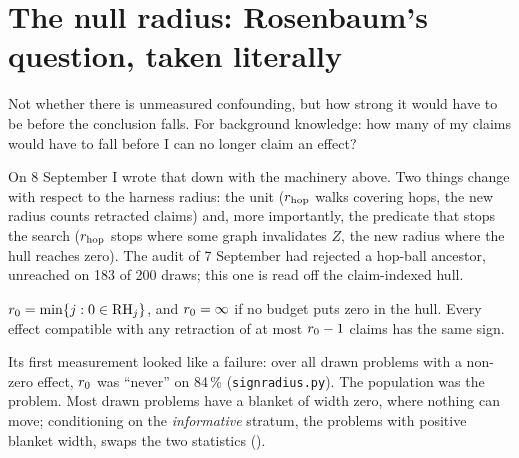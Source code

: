 
\begin{antes}
\end{antes}

\section{The null radius: Rosenbaum's question, taken literally}
\label{sec:redef-null}

\begin{ideia}
Not whether there is unmeasured confounding, but how strong it would have to be before the conclusion falls. For
background knowledge: how many of my claims would have to fall before I can no longer claim an effect?
\end{ideia}

On 8 September I wrote that down with the machinery above. Two things change with respect to the harness radius:
the unit ($r_{\mathrm{hop}}$ walks covering hops, the new radius counts retracted claims) and, more importantly, the predicate
that stops the search ($r_{\mathrm{hop}}$ stops where some graph invalidates $Z$, the new radius where the hull reaches zero). The audit of 7 September had rejected
a hop-ball ancestor, unreached on 183 of 200 draws; this one is read off the claim-indexed hull.

\begin{definicao}
$r_{0} = \min\{ j : 0 \in \mathrm{RH}_j \}$, and $r_{0} = \infty$ if no budget puts zero in the hull. Every effect
compatible with any retraction of at most $r_{0} - 1$ claims has the same sign.
\end{definicao}

Its first measurement looked like a failure: over all drawn problems with a non-zero effect, $r_{0}$ was ``never'' on
84\,\% (\texttt{signradius.py}). The population was the problem. Most drawn problems have a blanket of width zero, where
nothing can move; conditioning on the \emph{informative} stratum, the problems with positive blanket width, swaps the
two statistics ().

